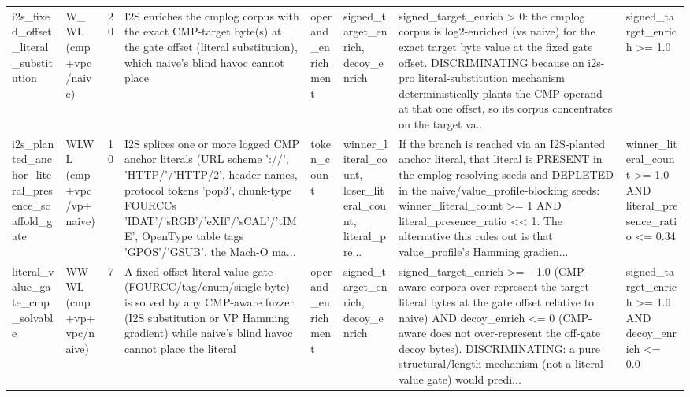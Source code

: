 \documentclass[7pt]{extarticle}
\begin{document}
{\begin{longtable}{@{}p{2.4cm}p{1.9cm}rp{4.3cm}p{1.5cm}p{1.7cm}p{4.6cm}p{3.0cm}@{}}
i2s\_\allowbreak fixed\_\allowbreak offset\_\allowbreak literal\_\allowbreak substitution & W\_\allowbreak WL (cmp+vpc/naive) & 20 & I2S enriches the cmplog corpus with the exact CMP-target byte(s) at the gate offset (literal substitution), which naive's blind havoc cannot place & operand\_\allowbreak enrichment & signed\_\allowbreak target\_\allowbreak enrich, decoy\_\allowbreak enrich & signed\_\allowbreak target\_\allowbreak enrich \textgreater{} 0: the cmplog corpus is log2-enriched (vs naive) for the exact target byte value at the fixed gate offset. DISCRIMINATING because an i2s-pro literal-substitution mechanism deterministically plants the CMP operand at that one offset, so its corpus concentrates on the target va... & signed\_\allowbreak target\_\allowbreak enrich \textgreater{}= 1.0\\
i2s\_\allowbreak planted\_\allowbreak anchor\_\allowbreak literal\_\allowbreak presence\_\allowbreak scaffold\_\allowbreak gate & WLWL (cmp+vpc/vp+naive) & 10 & I2S splices one or more logged CMP anchor literals (URL scheme '://', 'HTTP/'/'HTTP/2', header names, protocol tokens 'pop3', chunk-type FOURCCs 'IDAT'/'sRGB'/'eXIf'/'sCAL'/'tIME', OpenType table tags 'GPOS'/'GSUB', the Mach-O ma... & token\_\allowbreak count & winner\_\allowbreak literal\_\allowbreak count, loser\_\allowbreak literal\_\allowbreak count, literal\_\allowbreak pre... & If the branch is reached via an I2S-planted anchor literal, that literal is PRESENT in the cmplog-resolving seeds and DEPLETED in the naive/value\_\allowbreak profile-blocking seeds: winner\_\allowbreak literal\_\allowbreak count \textgreater{}= 1 AND literal\_\allowbreak presence\_\allowbreak ratio \textless{}\textless{} 1. The alternative this rules out is that value\_\allowbreak profile's Hamming gradien... & winner\_\allowbreak literal\_\allowbreak count \textgreater{}= 1.0 AND literal\_\allowbreak presence\_\allowbreak ratio \textless{}= 0.34\\
literal\_\allowbreak value\_\allowbreak gate\_\allowbreak cmp\_\allowbreak solvable & WWWL (cmp+vp+vpc/naive) & 7 & A fixed-offset literal value gate (FOURCC/tag/enum/single byte) is solved by any CMP-aware fuzzer (I2S substitution or VP Hamming gradient) while naive's blind havoc cannot place the literal & operand\_\allowbreak enrichment & signed\_\allowbreak target\_\allowbreak enrich, decoy\_\allowbreak enrich & signed\_\allowbreak target\_\allowbreak enrich \textgreater{}= +1.0 (CMP-aware corpora over-represent the target literal bytes at the gate offset relative to naive) AND decoy\_\allowbreak enrich \textless{}= 0 (CMP-aware does not over-represent the off-gate decoy bytes). DISCRIMINATING: a pure structural/length mechanism (not a literal-value gate) would predi... & signed\_\allowbreak target\_\allowbreak enrich \textgreater{}= 1.0 AND decoy\_\allowbreak enrich \textless{}= 0.0\\

\end{longtable}}
\end{document}
